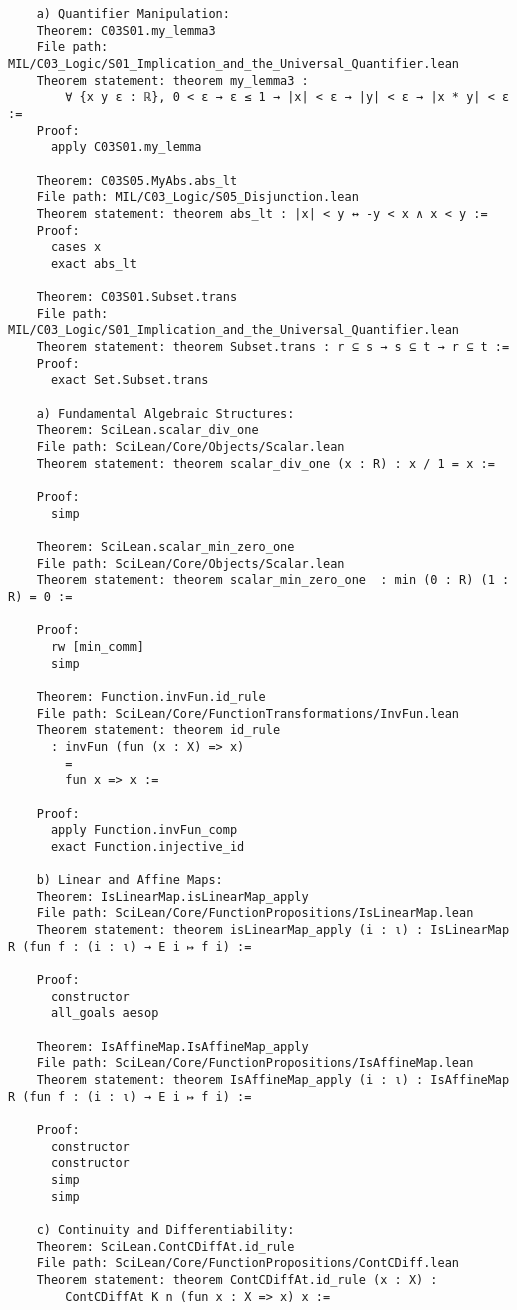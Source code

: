 \documentclass{article} %
\begin{document}
\begin{verbatim}
    a) Quantifier Manipulation:
    Theorem: C03S01.my_lemma3
    File path: MIL/C03_Logic/S01_Implication_and_the_Universal_Quantifier.lean
    Theorem statement: theorem my_lemma3 :
        ∀ {x y ε : ℝ}, 0 < ε → ε ≤ 1 → |x| < ε → |y| < ε → |x * y| < ε :=
    Proof:
      apply C03S01.my_lemma
    
    Theorem: C03S05.MyAbs.abs_lt
    File path: MIL/C03_Logic/S05_Disjunction.lean
    Theorem statement: theorem abs_lt : |x| < y ↔ -y < x ∧ x < y :=
    Proof:
      cases x
      exact abs_lt

    Theorem: C03S01.Subset.trans
    File path: MIL/C03_Logic/S01_Implication_and_the_Universal_Quantifier.lean
    Theorem statement: theorem Subset.trans : r ⊆ s → s ⊆ t → r ⊆ t :=
    Proof:
      exact Set.Subset.trans

    a) Fundamental Algebraic Structures:
    Theorem: SciLean.scalar_div_one
    File path: SciLean/Core/Objects/Scalar.lean
    Theorem statement: theorem scalar_div_one (x : R) : x / 1 = x :=
    
    Proof:
      simp
    
    Theorem: SciLean.scalar_min_zero_one
    File path: SciLean/Core/Objects/Scalar.lean
    Theorem statement: theorem scalar_min_zero_one  : min (0 : R) (1 : R) = 0 :=
    
    Proof:
      rw [min_comm]
      simp
    
    Theorem: Function.invFun.id_rule
    File path: SciLean/Core/FunctionTransformations/InvFun.lean
    Theorem statement: theorem id_rule
      : invFun (fun (x : X) => x)
        =
        fun x => x :=
    
    Proof:
      apply Function.invFun_comp
      exact Function.injective_id

    b) Linear and Affine Maps:
    Theorem: IsLinearMap.isLinearMap_apply
    File path: SciLean/Core/FunctionPropositions/IsLinearMap.lean
    Theorem statement: theorem isLinearMap_apply (i : ι) : IsLinearMap R (fun f : (i : ι) → E i ↦ f i) :=
    
    Proof:
      constructor
      all_goals aesop
    
    Theorem: IsAffineMap.IsAffineMap_apply
    File path: SciLean/Core/FunctionPropositions/IsAffineMap.lean
    Theorem statement: theorem IsAffineMap_apply (i : ι) : IsAffineMap R (fun f : (i : ι) → E i ↦ f i) :=
    
    Proof:
      constructor
      constructor
      simp
      simp

    c) Continuity and Differentiability:
    Theorem: SciLean.ContCDiffAt.id_rule
    File path: SciLean/Core/FunctionPropositions/ContCDiff.lean
    Theorem statement: theorem ContCDiffAt.id_rule (x : X) :
        ContCDiffAt K n (fun x : X => x) x :=
    

\end{verbatim}
\end{document}
